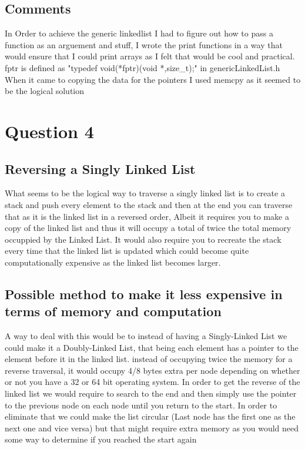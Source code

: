 \documentclass{article}
\begin{document}
		\subsection{Comments}
			In Order to achieve the generic linkedlist I had to figure out how to pass a function as an arguement and stuff, I wrote the print functions in a way that would ensure that I could print arrays as I felt that would be cool and practical.\\fptr is defined as "typedef void(*fptr)(void *,size\_t);" in genericLinkedList.h\\When it came to copying the data for the pointers I used memcpy as it seemed to be the logical solution
	\section{Question 4}
		\subsection{Reversing a Singly Linked List}
			What seems to  be the logical way to traverse a singly linked list is to create a stack and push every element to the stack and then at the end you can traverse that as it is the linked list in a reversed order, Albeit it requires you to make a copy of the linked list and thus it will occupy a total of twice the total memory occuppied by the Linked List.  It would also require you to recreate the stack every time that the linked list is updated which could become quite computationally expensive as the linked list becomes larger.
		\subsection{Possible method to make it less expensive in terms of memory and computation}
			A way to deal with this would be to instead of having a Singly-Linked List we could make it a Doubly-Linked List, that being each element has a pointer to the element before it in the linked list. instead of occupying twice the memory for a reverse traversal, it would occupy 4/8 bytes extra per node depending on whether or not you have a 32 or 64 bit operating system. In order to get the reverse of the linked list we would require to search to the end and then simply use the pointer to the previous node on each node until you return to the start. In order to eliminate that we could make the list circular (Last node has the first one as the next one and vice versa) but that might require extra memory as you would need some way to determine if you reached the start again 
	
	
\end{document}
